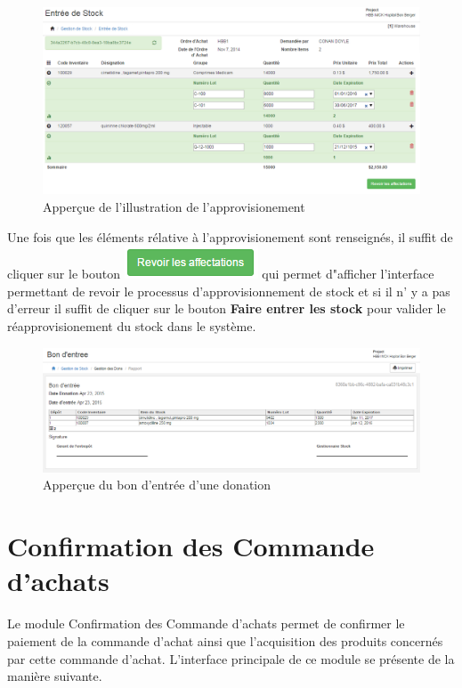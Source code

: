 \documentclass[12pt,a4paper]{report}
\begin{document}
\begin{figure}[h]
\begin{center}
\includegraphics[width=12cm]{pic/AppStockOK.png}
\end{center}
\caption{Apperçue de l'illustration de l'approvisionement}
\label{Apperçue de l'illustration de l'approvisionement}
\end{figure}
\newpage

Une fois que les éléments rélative à l'approvisionement sont renseignés, il suffit de cliquer sur le bouton \includegraphics[scale=0.7]{pic/RevAffectation.png} qui permet d"afficher l'interface permettant de revoir le processus d'approvisionnement de stock et si il n' y a pas d'erreur il suffit de cliquer sur le bouton \textbf{Faire entrer les stock} pour valider le réapprovisionement du stock dans le système.

\begin{figure}[h]
\begin{center}
\includegraphics[width=12cm]{pic/BonEntryDonation.png}
\end{center}
\caption{Apperçue du bon d'entrée d'une donation}
\label{Apperçue du bon d'entrée d'une donation}
\end{figure}

\newpage
\section{Confirmation des Commande d'achats}
Le module Confirmation des Commande d'achats permet de confirmer le paiement de la commande d'achat ainsi que l'acquisition des produits concernés par cette commande d'achat. L'interface principale de ce module se présente de la manière suivante.
\end{document}
